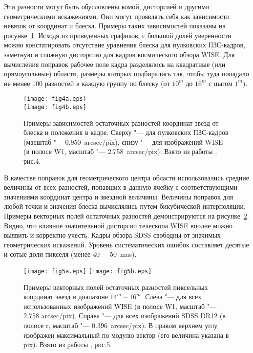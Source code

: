 Эти разности могут быть обусловлены комой, дисторсией и другими геометрическими искажениями. Они могут проявлять себя как зависимости невязок от координат и блеска. Примеры таких зависимостей показаны на рисунке~\ref{fig:15posL}. Исходя из приведенных графиков, с большой долей уверенности можно констатировать отсутствие уравнения блеска для пулковских ПЗС-кадров, заметную и сложную дисторсию для кадров космического обзора WISE. Для вычисления поправок рабочее поле кадра разделялось на квадратные (или прямоугольные) области, размеры которых подбирались так, чтобы туда попадало не менее 100 разностей в каждую группу по блеску (от $10^m$ до $16^m$ с шагом $1^m$).

\begin{figure}[h]
\centering
\texttt{[image: fig4a.eps]}\\
\texttt{[image: fig4b.eps]}
\caption{Примеры зависимостей остаточных разностей координат звезд от блеска и положения в кадре. Сверху "--- для пулковских ПЗС-кадров (масштаб "--- 0.950~arcsec/pix), снизу "--- для изображений WISE (в полосе W1, масштаб "--- 2.758~arcsec/pix). Взято из работы \cite{2015AstL...41..833K}, рис.4.}
\label{fig:15posL}
\end{figure}

В качестве поправок для геометрического центра области использовались средние величины от всех разностей, попавших в данную ячейку с соответствующими значениями координат центра и звездной величины. Величины поправок для любой точки и значения блеска вычислялись путем бикубической интерполяции. Примеры векторных полей остаточных разностей демонстрируются на рисунке~\ref{fig:15pixL}. Видно, что влияние значительной дисторсии телескопа WISE вполне можно выявить и корректно учесть. Кадры обзора SDSS свободны от значимых геометрических искажений. Уровень систематических ошибок составляет десятые и сотые доли пикселя (менее 40~--~50~mas).

\begin{figure}[h]
\centering
\texttt{[image: fig5a.eps]}
\texttt{[image: fig5b.eps]}
\caption{Примеры векторных полей остаточных разностей пиксельных координат звезд в диапазоне $14^m$ -- $16^m$. Слева "--- для всех использованных изображений WISE (в полосе W1, масштаб "--- 2.758 arcsec/pix). Справа "--- для всех изображений SDSS DR12 (в полосе r, масштаб "--- 0.396~arcsec/pix). В правом верхнем углу изображен максимальный по модулю вектор (его величина указана в pix). Взято из работы \cite{2015AstL...41..833K}, рис.5.}
\label{fig:15pixL}
\end{figure}

